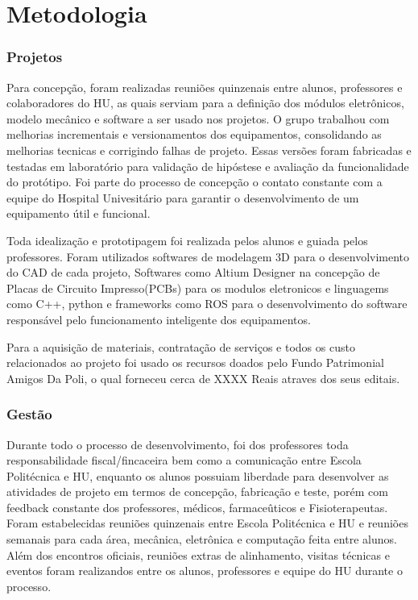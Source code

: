 \documentclass[../poliXuniversity_hospital_(USP)_report.tex]{subfiles}
\begin{document}
\chapter{Metodologia}

\subsection{Projetos}

Para concepção, foram realizadas reuniões quinzenais entre alunos, professores e colaboradores do HU, as quais serviam para a definição dos módulos eletrônicos, modelo mecânico e software a ser usado nos projetos. O grupo trabalhou com melhorias incrementais e versionamentos dos equipamentos, consolidando as melhorias tecnicas e corrigindo falhas de projeto. Essas versões foram fabricadas e testadas em laboratório para validação de hipóstese e avaliação da funcionalidade do protótipo. Foi parte do processo de concepção o contato constante com a equipe do Hospital Univesitário para garantir o desenvolvimento de um equipamento útil e funcional.

Toda idealização e prototipagem foi realizada pelos alunos e guiada pelos professores. Foram utilizados softwares de modelagem 3D para o desenvolvimento do CAD de cada projeto, Softwares como Altium Designer na concepção de Placas de Circuito Impresso(PCBs) para os modulos eletronicos e linguagems como C++, python e frameworks como ROS para o desenvolvimento do software responsável pelo funcionamento inteligente dos equipamentos.

Para a aquisição de materiais, contratação de serviços e todos os custo relacionados ao projeto foi usado os recursos doados pelo Fundo Patrimonial Amigos Da Poli, o qual forneceu cerca de XXXX Reais atraves dos seus editais. 

\subsection{Gestão}

Durante todo o processo de desenvolvimento, foi dos professores toda responsabilidade fiscal/fincaceira bem como a comunicação entre Escola Politécnica e HU, enquanto os alunos possuiam liberdade para desenvolver as atividades de projeto em termos de concepção, fabricação e teste, porém com feedback constante dos professores, médicos, farmaceûticos e Fisioterapeutas. Foram estabelecidas reuniões quinzenais entre Escola Politécnica e HU e reuniões semanais para cada área, mecânica, eletrônica e computação feita entre alunos. Além dos encontros oficiais, reuniões extras de alinhamento, visitas técnicas e eventos foram realizandos entre os alunos, professores e equipe do HU durante o processo.
\end{document}
